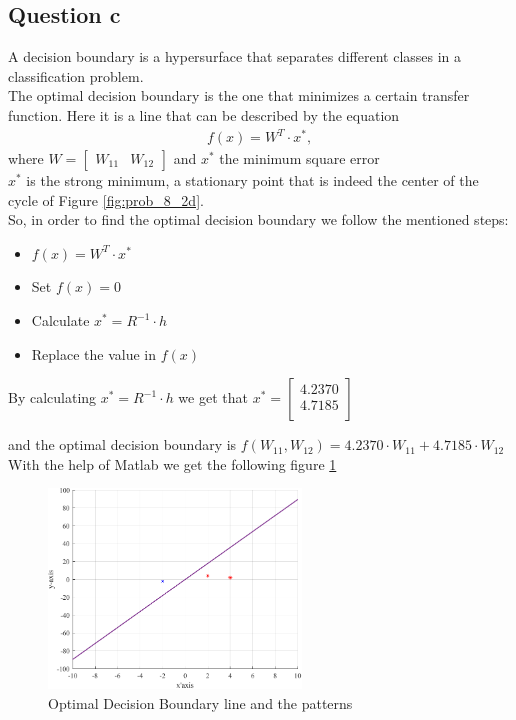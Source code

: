 \subsection{Question c}
\label{Questionc}
A decision boundary is a hypersurface that separates different classes in a classification problem.\\
The optimal decision boundary is the one that minimizes a certain transfer function. Here it is a line that can be described by the equation 
\[
\begin{gathered}
	f(x) = W^T \cdot x^*, 
\end{gathered}
\]
where $
W=\left[\begin{array}{cc}
	W_{11} & W_{12}
\end{array}
\right]
$ and $x^*$ the minimum square error \\
$x^*$ is the strong minimum, a stationary point that is indeed the center of the cycle of Figure \ref{fig:prob_8_2d}.\\

So, in order to find the optimal decision boundary we follow the mentioned steps:
\begin{itemize}
	\item $f(x) = W^T \cdot x^*$
	\item Set $f(x) = 0$
	\item Calculate $x^* = R^{-1} \cdot h$
	\item Replace the value in $f(x)$
\end{itemize}

By calculating $x^* = R^{-1} \cdot h$ we get that $x^* = \left[\begin{array}{c}
															4.2370 \\
															4.7185 \\
														\end{array}
														\right] $

\vspace{5mm}
and the optimal decision boundary is $f(W_{11},W_{12}) = 4.2370 \cdot W_{11} + 4.7185 \cdot W_{12} $ \\

With the help of Matlab we get the following figure \ref{fig:patterns}

\begin{figure}[H]
	\centering
	\includegraphics[width = 0.6\textwidth]{../Problem 8/patterns.pdf}
	\caption{Optimal Decision Boundary line and the patterns}
	\label{fig:patterns}
\end{figure}

